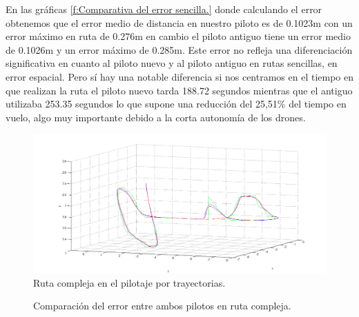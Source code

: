 \hspace{1cm} En las gráficas \ref{f:Comparativa del error sencilla.} donde calculando el error obtenemos que el error medio de distancia en nuestro piloto es de 0.1023m con un error máximo en ruta de 0.276m en cambio el piloto antiguo tiene un error medio de 0.1026m y un error máximo de 0.285m. Este error no refleja una diferenciación significativa en cuanto al piloto nuevo y al piloto antiguo en rutas sencillas, en error espacial. Pero sí hay una notable diferencia si nos centramos en el tiempo en que realizan la ruta el piloto nuevo tarda 188.72 segundos mientras que el antiguo utilizaba 253.35 segundos lo que supone una reducción del 25,51\% del tiempo en vuelo, algo muy importante debido a la corta autonomía de los drones.

\begin{figure}[H]
	\begin{center}
		\includegraphics[width=1\textwidth]{imag/IMG41.png}
				\caption{Ruta compleja en el pilotaje por trayectorias.}
		\label{fig:Ruta compleja en trayectoria.}	
	\end{center}
\end{figure}

\begin{figure}[H]
 \centering
 \caption{Comparación del error entre ambos pilotos en ruta compleja.}
 \label{f:Comparativa del error compleja.}
\end{figure} 

